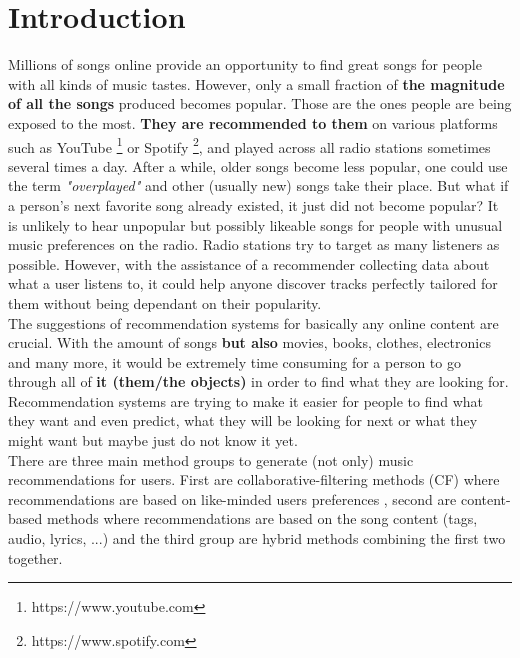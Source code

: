 \chapter*{Introduction}
Millions of songs online provide an opportunity to find great songs for people with all kinds of music tastes. However, only a small fraction of {\bf the magnitude of all the songs} produced becomes popular. Those are the ones people are being exposed to the most. {\bf They are recommended to them} on various platforms such as YouTube \footnote{https://www.youtube.com} or Spotify \footnote{https://www.spotify.com}, and played across all radio stations sometimes several times a day. After a while, older songs become less popular, one could use the term \textit{"overplayed"} and other (usually new) songs take their place. But what if a person's next favorite song already existed, it just did not become popular? It is unlikely to hear unpopular but possibly likeable songs for people with unusual music preferences on the radio. Radio stations try to target as many listeners as possible. However, with the assistance of a recommender collecting data about what a user listens to, it could help anyone discover tracks perfectly tailored for them without being dependant on their popularity.\\
The suggestions of recommendation systems for basically any online content are crucial. With the amount of songs {\bf but also} movies, books, clothes, electronics and many more, it would be extremely time consuming for a person to go through all of {\bf it (them/the objects)} in order to find what they are looking for. Recommendation systems are trying to make it easier for people to find what they want and even predict, what they will be looking for next or what they might want but maybe just do not know it yet. \\
There are three main method groups to generate (not only) music recommendations for users. First are collaborative-filtering methods (CF) where recommendations are based on like-minded users preferences , second are content-based methods where recommendations are based on the song content (tags, audio, lyrics, ...) and the third group are hybrid methods combining the first two together. \\
